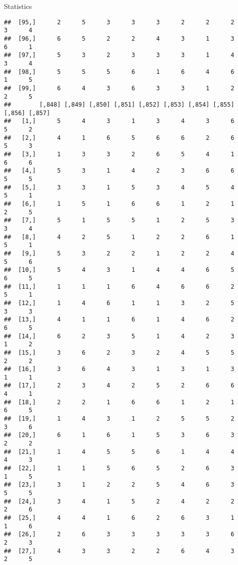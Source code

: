 \documentclass[
  ignorenonframetext,
]{beamer}
\begin{document}
\begin{frame}[fragile]{Statistics}
\begin{verbatim}
##  [95,]      2      5      3      3      3      2      2      2      3      4
##  [96,]      6      5      2      2      4      3      1      3      6      1
##  [97,]      5      3      2      3      3      3      1      4      3      4
##  [98,]      5      5      5      6      1      6      4      6      1      5
##  [99,]      6      4      3      6      3      3      1      2      2      5
##        [,848] [,849] [,850] [,851] [,852] [,853] [,854] [,855] [,856] [,857]
##   [1,]      5      4      3      1      3      4      3      6      5      2
##   [2,]      4      1      6      5      6      6      2      6      5      3
##   [3,]      1      3      3      2      6      5      4      1      6      6
##   [4,]      5      3      1      4      2      3      6      6      5      5
##   [5,]      3      3      1      5      3      4      5      4      5      1
##   [6,]      1      5      1      6      6      1      2      1      2      5
##   [7,]      5      1      5      5      1      2      5      3      3      4
##   [8,]      4      2      5      1      2      2      6      1      5      1
##   [9,]      5      3      2      2      1      2      2      4      5      6
##  [10,]      5      4      3      1      4      4      6      5      6      5
##  [11,]      1      1      1      6      4      6      6      2      5      1
##  [12,]      1      4      6      1      1      3      2      5      3      3
##  [13,]      4      1      1      6      1      4      6      2      6      5
##  [14,]      6      2      3      5      1      4      2      3      1      2
##  [15,]      3      6      2      3      2      4      5      5      2      2
##  [16,]      3      6      4      3      1      3      1      3      1      1
##  [17,]      2      3      4      2      5      2      6      6      4      1
##  [18,]      2      2      1      6      6      1      2      1      6      5
##  [19,]      1      4      3      1      2      5      5      2      3      6
##  [20,]      6      1      6      1      5      3      6      3      2      2
##  [21,]      1      4      5      5      6      1      4      4      4      3
##  [22,]      1      1      5      6      5      2      6      3      1      5
##  [23,]      3      1      2      2      5      4      6      3      5      5
##  [24,]      3      4      1      5      2      4      2      2      2      6
##  [25,]      4      4      1      6      2      6      3      1      1      6
##  [26,]      2      6      3      3      3      3      3      6      2      3
##  [27,]      4      3      3      2      2      6      4      3      2      5

\end{verbatim}
\end{frame}
\end{document}
